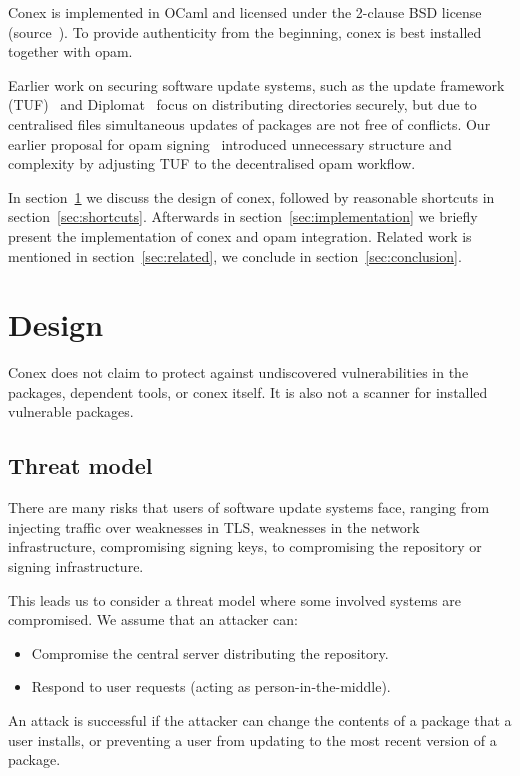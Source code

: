 \documentclass[nocopyrightspace]{sigplanconf}
\begin{document}
Conex is implemented in OCaml and licensed under the 2-clause BSD license (source~\cite{conex}).
To provide authenticity from the beginning, conex is best installed together with opam.

Earlier work on securing software update systems, such as the update framework (TUF)~\cite{tuf} and Diplomat~\cite{diplomat} focus on distributing directories securely, but due to centralised files simultaneous updates of packages are not free of conflicts.
Our earlier proposal for opam signing~\cite{opamsigning} introduced unnecessary structure and complexity by adjusting TUF to the decentralised opam workflow.

In section~\ref{sec:design} we discuss the design of conex, followed by reasonable shortcuts in section~\ref{sec:shortcuts}.
Afterwards in section~\ref{sec:implementation} we briefly present the implementation of conex and opam integration.
Related work is mentioned in section~\ref{sec:related}, we conclude in section~\ref{sec:conclusion}.

\section{Design} \label{sec:design}
Conex does not claim to protect against undiscovered vulnerabilities in the packages, dependent tools, or conex itself.
It is also not a scanner for installed vulnerable packages.

\subsection{Threat model}
There are many risks that users of software update systems face, ranging from injecting traffic over weaknesses in TLS, weaknesses in the network infrastructure, compromising signing keys, to compromising the repository or signing infrastructure.

This leads us to consider a threat model where some involved systems are compromised.  We assume that an attacker can:
\begin{itemize}
  \item Compromise the central server distributing the repository.
  \item Respond to user requests (acting as person-in-the-middle).
\end{itemize}

An attack is successful if the attacker can change the contents of a package that a user installs, or preventing a user from updating to the most recent version of a package.
\end{document}
